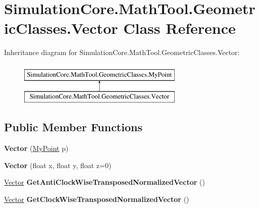 \hypertarget{class_simulation_core_1_1_math_tool_1_1_geometric_classes_1_1_vector}{}\section{Simulation\+Core.\+Math\+Tool.\+Geometric\+Classes.\+Vector Class Reference}
\label{class_simulation_core_1_1_math_tool_1_1_geometric_classes_1_1_vector}
Inheritance diagram for Simulation\+Core.\+Math\+Tool.\+Geometric\+Classes.\+Vector\+:\begin{figure}[H]
\begin{center}
\leavevmode
\includegraphics[height=2.000000cm]{class_simulation_core_1_1_math_tool_1_1_geometric_classes_1_1_vector}
\end{center}
\end{figure}
\subsection*{Public Member Functions}
\begin{DoxyCompactItemize}
\item 
{\bfseries Vector} (\hyperlink{class_simulation_core_1_1_math_tool_1_1_geometric_classes_1_1_my_point}{My\+Point} p)\hypertarget{class_simulation_core_1_1_math_tool_1_1_geometric_classes_1_1_vector_a57585dcdc90074156e452da021e361cb}{}\label{class_simulation_core_1_1_math_tool_1_1_geometric_classes_1_1_vector_a57585dcdc90074156e452da021e361cb}

\item 
{\bfseries Vector} (float x, float y, float z=0)\hypertarget{class_simulation_core_1_1_math_tool_1_1_geometric_classes_1_1_vector_a9e573d7c6d8cd581cbd4595dd2dbff14}{}\label{class_simulation_core_1_1_math_tool_1_1_geometric_classes_1_1_vector_a9e573d7c6d8cd581cbd4595dd2dbff14}

\item 
\hyperlink{class_simulation_core_1_1_math_tool_1_1_geometric_classes_1_1_vector}{Vector} {\bfseries Get\+Anti\+Clock\+Wise\+Transposed\+Normalized\+Vector} ()\hypertarget{class_simulation_core_1_1_math_tool_1_1_geometric_classes_1_1_vector_a2bd390831d1e2d25d407ae0b2c6b3aa2}{}\label{class_simulation_core_1_1_math_tool_1_1_geometric_classes_1_1_vector_a2bd390831d1e2d25d407ae0b2c6b3aa2}

\item 
\hyperlink{class_simulation_core_1_1_math_tool_1_1_geometric_classes_1_1_vector}{Vector} {\bfseries Get\+Clock\+Wise\+Transposed\+Normalized\+Vector} ()\hypertarget{class_simulation_core_1_1_math_tool_1_1_geometric_classes_1_1_vector_a159beeb3af075a54db3b183b0691eceb}{}\label{class_simulation_core_1_1_math_tool_1_1_geometric_classes_1_1_vector_a159beeb3af075a54db3b183b0691eceb}

\end{DoxyCompactItemize}
